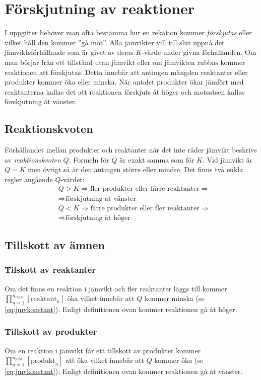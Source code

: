 \section{Förskjutning av reaktioner}

I uppgifter behöver man ofta bestämma hur en rekation kommer \emph{förskjutas} eller vilket håll den kommer ''gå mot''. Alla jämvikter vill till slut uppnå det jämviktsförhållande som är givet av deras $K$-värde under givna förhållanden. Om man börjar från ett tillstånd utan jämvikt eller om jämvikten rubbas kommer reaktionen att förskjutas. Detta innebär att antingen mängden reaktanter eller produkter kommer öka eller minska. När antalet produkter ökar jämfört med reaktanterna kallas det att reaktionen förskjuts åt höger och motsatsen kallas förskjutning åt vänster.

\subsection{Reaktionskvoten}

Förhållandet mellan produkter och reaktanter när det inte råder jämvikt beskrivs av \emph{reaktionskvoten} $Q$. Formeln för $Q$ är exakt samma som för $K$. Vid jämvikt är $Q=K$ men övrigt så är den antingen större eller mindre. Det finns två enkla regler angående $Q$-värdet:
\begin{align*}
    &Q > K \Rightarrow \text{fler produkter eller färre reaktanter} \Rightarrow \\ 
    &\Rightarrow \text{förskjutning åt vänster} \\
    &Q < K \Rightarrow \text{färre produkter eller fler reaktanter} \Rightarrow \\ 
    &\Rightarrow \text{förskjutning åt höger}
\end{align*}

\subsection{Tillskott av ämnen}
\subsubsection[Reaktanter]{Tilskott av reaktanter}
Om det finns en reaktion i jämvikt och fler reaktanter läggs till kommer $\prod^{n_{reakt}}_{n=1}[\mathrm{reaktant}_n]$ öka vilket innebär att $Q$ kommer minska (se \cref{eq:jmvkonstant}). Enligt definitionen ovan kommer reaktionen gå åt höger.
\subsubsection[Produkter]{Tillskott av produkter}
Om en reaktion i jämvikt får ett tillskott av produkter kommer $\prod^{n_{prod}}_{n=1}[\mathrm{produkt}_n]$ att öka vilket innebär att $Q$ kommer öka (se \cref{eq:jmvkonstant}). Enligt definitionen ovan kommer reaktionen gå åt vänster.

